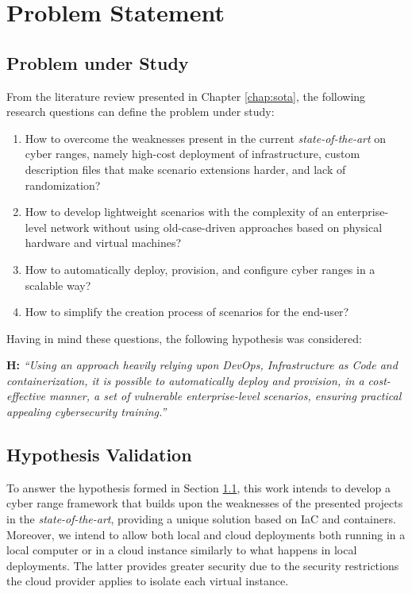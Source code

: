 \chapter{Problem Statement}\label{chap:problem_statement}

\minitoc

\section{Problem under Study} \label{sec:research_problem}

From the literature review presented in Chapter \ref{chap:sota}, the following research questions can define the problem under study:

\begin{enumerate}
    \item How to overcome the weaknesses present in the current \textit{state-of-the-art} on cyber ranges, namely high-cost deployment of infrastructure, custom description files that make scenario extensions harder, and lack of randomization? 
    \item How to develop lightweight scenarios with the complexity of an enterprise-level network without using old-case-driven approaches based on physical hardware and virtual machines?
    \item How to automatically deploy, provision, and configure cyber ranges in a scalable way?
    \item How to simplify the creation process of scenarios for the end-user?
\end{enumerate}

Having in mind these questions, the following hypothesis was considered:\\

\leftskip=1.25cm\rightskip=1.25cm

\textbf{H:} \textit{``Using an approach heavily relying upon DevOps, Infrastructure as Code and containerization, it is possible to automatically deploy and provision, in a cost-effective manner, a set of vulnerable enterprise-level scenarios, ensuring practical appealing cybersecurity training.''}

\leftskip=0cm\rightskip=0cm

\section{Hypothesis Validation} \label{sec:hypothesis_validation}

To answer the hypothesis formed in Section \ref{sec:research_problem}, this work intends to develop a cyber range framework that builds upon the weaknesses of the presented projects in the \textit{state-of-the-art}, providing a unique solution based on IaC and containers. Moreover, we intend to allow both local and cloud deployments both running in a local computer or in a cloud instance similarly to what happens in local deployments. The latter provides greater security due to the security restrictions the cloud provider applies to isolate each virtual instance.  

